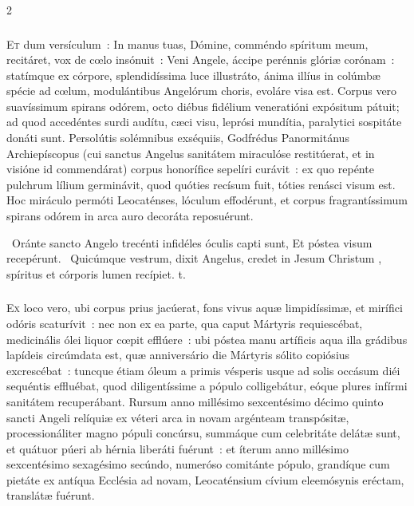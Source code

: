 \documentclass[9pt,twoside]{extarticle}
\begin{document}
\begin{multicols}{2}
\subsubsection*{\center {}}
\lettrine{E}t dum versículum~: In manus tuas, Dómine, comméndo spíritum meum, recitáret, vox de cœlo insónuit~: Veni Angele, áccipe perénnis glóriæ corónam~: statímque ex córpore, splendidíssima luce illustráto, ánima illíus in colúmbæ spécie ad cœlum, modulántibus Angelórum choris, evoláre visa est. Corpus vero suavíssimum spirans odórem, octo diébus fidélium veneratióni expósitum pátuit; ad quod accedéntes surdi audítu, cæci visu, leprósi mundítia, paralytici sospitáte donáti sunt. Persolútis solémnibus exséquiis, Godfrédus Panormitánus Archiepíscopus (cui sanctus Angelus sanitátem miraculóse restitúerat, et in visióne id commendárat) corpus honorífice sepelíri curávit~: ex quo repénte pulchrum lílium germinávit, quod quóties recísum fuit, tóties renásci visum est. Hoc miráculo permóti Leocaténses, lóculum effodérunt, et corpus fragrantíssimum spirans odórem in arca auro decoráta reposuérunt.

\begin{tightlist}{}
\item {}~Oránte sancto Angelo trecénti infidéles óculis capti sunt, \textred{*} Et póstea visum recepérunt.
~Quicúmque vestrum, dixit Angelus, credet in Jesum Christum , spíritus et córporis lumen recípiet. t.
\end{tightlist}

\subsubsection*{\center {}}
\lettrine{E}x loco vero, ubi corpus prius jacúerat, fons vivus aquæ limpidíssimæ, et mirífici odóris scaturívit~: nec non ex ea parte, qua caput Mártyris requiescébat, medicinális ólei liquor cœpit efflúere~: ubi póstea manu artíficis aqua illa grádibus lapídeis circúmdata est, quæ anniversário die Mártyris sólito copiósius excrescébat~: tuncque étiam óleum a primis vésperis usque ad solis occásum diéi sequéntis effluébat, quod diligentíssime a pópulo colligebátur, eóque plures infírmi sanitátem recuperábant. Rursum anno millésimo sexcentésimo décimo quinto sancti Angeli relíquiæ ex véteri arca in novam argénteam transpósitæ, processionáliter magno pópuli concúrsu, summáque cum celebritáte delátæ sunt, et quátuor púeri ab hérnia liberáti fuérunt~: et íterum anno millésimo sexcentésimo sexagésimo secúndo, numeróso comitánte pópulo, grandíque cum pietáte ex antíqua Ecclésia ad novam, Leocaténsium cívium eleemósynis eréctam, translátæ fuérunt.


\end{multicols}
\end{document}
